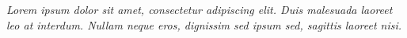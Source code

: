 \documentclass[
	12pt,				%
	openright,			%
	twoside,			%
	a4paper,			%
	english,			%
	french,				%
	spanish,			%
	brazil				%
	]{abntex2}
\begin{document}
% 

\begin{comment}
\begin{folhadeaprovacao}
  \begin{center}
    {\ABNTEXchapterfont\large\imprimirautor}
    \vspace*{\fill}\vspace*{\fill}
    \begin{center}
      \ABNTEXchapterfont\bfseries\Large\imprimirtitulo
    \end{center}
    \vspace*{\fill}
    \hspace{.45\textwidth}
    \begin{minipage}{.5\textwidth}
        \imprimirpreambulo
    \end{minipage}%
    \vspace*{\fill}
   \end{center}
   Trabalho aprovado. \imprimirlocal, 22 de março de 2017:
   \assinatura{\textbf{\imprimirorientador} \\ Orientador}
   \assinatura{\textbf{Professor} \\ Convidado 1}
   \assinatura{\textbf{Professor} \\ Convidado 2}
   \assinatura{\textbf{Professor} \\ Convidado 3}
   \assinatura{\textbf{Professor} \\ Convidado 4}
   \begin{center}
    \vspace*{0.5cm}
    {\large\imprimirlocal}
    \par
    {\large\imprimirdata}
    \vspace*{1cm}
  \end{center}  
\end{folhadeaprovacao}
\end{comment}

\begin{dedicatoria}
   \vspace*{\fill}
   \centering
   \noindent
   \textit{Lorem ipsum dolor sit amet, consectetur adipiscing elit. Duis malesuada laoreet leo at interdum. Nullam neque eros, dignissim sed ipsum sed, sagittis laoreet nisi.} \vspace*{\fill}
\end{dedicatoria}
\end{document}
